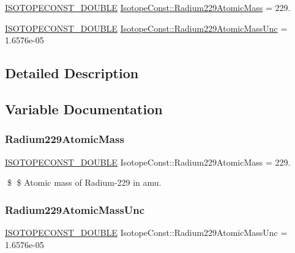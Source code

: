 \begin{DoxyCompactItemize}
\item 
\mbox{\hyperlink{group___isotope_const-_macros_ga8f45a7272ce02c0b4c65c44636ed719a}{I\+S\+O\+T\+O\+P\+E\+C\+O\+N\+S\+T\+\_\+\+D\+O\+U\+B\+LE}} \mbox{\hyperlink{group___isotope_const-_radium-_ra229_ga265b461fbb1c7d48c8dff63febf317ce}{Isotope\+Const\+::\+Radium229\+Atomic\+Mass}} = 229.
\item 
\mbox{\hyperlink{group___isotope_const-_macros_ga8f45a7272ce02c0b4c65c44636ed719a}{I\+S\+O\+T\+O\+P\+E\+C\+O\+N\+S\+T\+\_\+\+D\+O\+U\+B\+LE}} \mbox{\hyperlink{group___isotope_const-_radium-_ra229_ga99f2ef5304c214d0b25c3c3dd090a3c2}{Isotope\+Const\+::\+Radium229\+Atomic\+Mass\+Unc}} = 1.\+6576e-\/05
\end{DoxyCompactItemize}


\subsection{Detailed Description}


\subsection{Variable Documentation}
\mbox{\label{group___isotope_const-_radium-_ra229_ga265b461fbb1c7d48c8dff63febf317ce}} 
\subsubsection{\texorpdfstring{Radium229\+Atomic\+Mass}{Radium229AtomicMass}}
{\footnotesize\ttfamily \mbox{\hyperlink{group___isotope_const-_macros_ga8f45a7272ce02c0b4c65c44636ed719a}{I\+S\+O\+T\+O\+P\+E\+C\+O\+N\+S\+T\+\_\+\+D\+O\+U\+B\+LE}} Isotope\+Const\+::\+Radium229\+Atomic\+Mass = 229.}

\$ \$ Atomic mass of Radium-\/229 in amu. \mbox{\label{group___isotope_const-_radium-_ra229_ga99f2ef5304c214d0b25c3c3dd090a3c2}} 
\subsubsection{\texorpdfstring{Radium229\+Atomic\+Mass\+Unc}{Radium229AtomicMassUnc}}
{\footnotesize\ttfamily \mbox{\hyperlink{group___isotope_const-_macros_ga8f45a7272ce02c0b4c65c44636ed719a}{I\+S\+O\+T\+O\+P\+E\+C\+O\+N\+S\+T\+\_\+\+D\+O\+U\+B\+LE}} Isotope\+Const\+::\+Radium229\+Atomic\+Mass\+Unc = 1.\+6576e-\/05}

